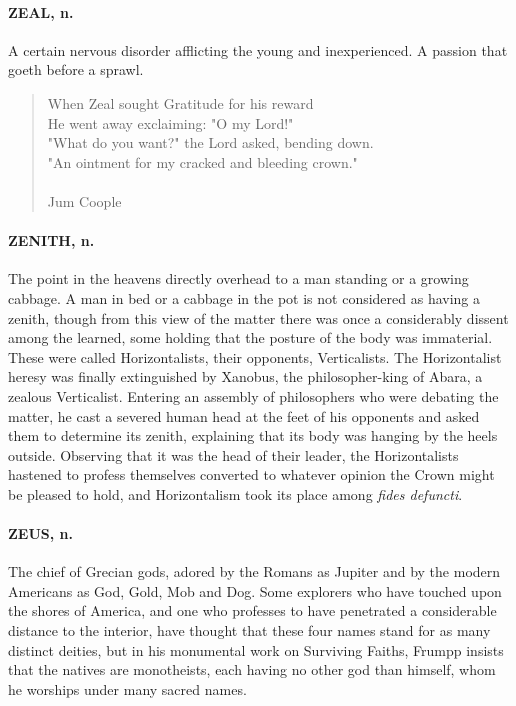 \documentclass[11pt]{article}
\begin{document}
\paragraph{ZEAL, n.}  A certain nervous disorder afflicting the young and
inexperienced.  A passion that goeth before a sprawl.

\begin{quote}   When Zeal sought Gratitude for his reward \\
  He went away exclaiming:  "O my Lord!" \\
  "What do you want?" the Lord asked, bending down. \\
  "An ointment for my cracked and bleeding crown." \\
 \\
Jum Coople \end{quote}


\paragraph{ZENITH, n.}  The point in the heavens directly overhead to a man
standing or a growing cabbage.  A man in bed or a cabbage in the pot
is not considered as having a zenith, though from this view of the
matter there was once a considerably dissent among the learned, some
holding that the posture of the body was immaterial.  These were
called Horizontalists, their opponents, Verticalists.  The
Horizontalist heresy was finally extinguished by Xanobus, the
philosopher-king of Abara, a zealous Verticalist.  Entering an
assembly of philosophers who were debating the matter, he cast a
severed human head at the feet of his opponents and asked them to
determine its zenith, explaining that its body was hanging by the
heels outside.  Observing that it was the head of their leader, the
Horizontalists hastened to profess themselves converted to whatever
opinion the Crown might be pleased to hold, and Horizontalism took its
place among {\em fides defuncti}.

\paragraph{ZEUS, n.}  The chief of Grecian gods, adored by the Romans as Jupiter
and by the modern Americans as God, Gold, Mob and Dog.  Some explorers
who have touched upon the shores of America, and one who professes to
have penetrated a considerable distance to the interior, have thought
that these four names stand for as many distinct deities, but in his
monumental work on Surviving Faiths, Frumpp insists that the natives
are monotheists, each having no other god than himself, whom he
worships under many sacred names.
\end{document}
